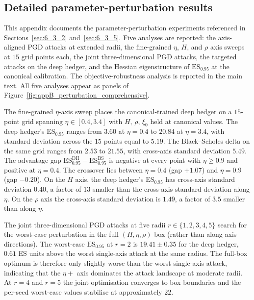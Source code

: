 \documentclass[12pt,a4paper]{article}
\theoremstyle{definition}
\theoremstyle{plain}
\theoremstyle{remark}
\theoremstyle{plain}
\begin{document}
\subsection{Detailed parameter-perturbation results}
\label{app:detailed_perturbation}

This appendix documents the parameter-perturbation experiments
referenced in Sections~\ref{sec:6_3_2} and~\ref{sec:6_3_5}. Five
analyses are reported: the axis-aligned PGD attacks at extended
radii, the fine-grained $\eta$, $H$, and $\rho$ axis sweeps at $15$
grid points each, the joint three-dimensional PGD attacks, the
targeted attacks on the deep hedger, and the Hessian eigenstructure
of $\mathrm{ES}_{0.95}$ at the canonical calibration. The
objective-robustness analysis is reported in the main text. All five
analyses appear as panels of
Figure~\ref{fig:appB_perturbation_comprehensive}.

The fine-grained $\eta$-axis sweep places the canonical-trained deep
hedger on a $15$-point grid spanning $\eta \in [0.4, 3.4]$ with $H$,
$\rho$, $\xi_0$ held at canonical values. The deep hedger's
$\mathrm{ES}_{0.95}$ ranges from $3.60$ at $\eta = 0.4$ to $20.84$ at
$\eta = 3.4$, with standard deviation across the $15$ points equal to
$5.19$. The Black--Scholes delta on the same grid ranges from $2.53$
to $21.55$, with cross-axis standard deviation $5.49$. The advantage
gap $\mathrm{ES}_{0.95}^{\mathrm{DH}} - \mathrm{ES}_{0.95}^{\mathrm{BS}}$
is negative at every point with $\eta \geq 0.9$ and positive at
$\eta = 0.4$. The crossover lies between $\eta = 0.4$ (gap $+1.07$)
and $\eta = 0.9$ (gap $-0.20$). On the $H$ axis, the deep hedger's
$\mathrm{ES}_{0.95}$ has cross-axis standard deviation $0.40$, a
factor of $13$ smaller than the cross-axis standard deviation along
$\eta$. On the $\rho$ axis the cross-axis standard deviation is
$1.49$, a factor of $3.5$ smaller than along $\eta$.

The joint three-dimensional PGD attacks at five radii $r \in \{1, 2,
3, 4, 5\}$ search for the worst-case perturbation in the full
$(H, \eta, \rho)$ box (rather than along axis directions). The
worst-case $\mathrm{ES}_{0.95}$ at $r = 2$ is $19.41 \pm 0.35$ for
the deep hedger, $0.61$ ES units above the worst single-axis
attack at the same radius. The full-box optimum is therefore only
slightly worse than the worst single-axis attack, indicating that
the $\eta+$ axis dominates the attack landscape at moderate radii.
At $r = 4$ and $r = 5$ the joint optimisation converges to box
boundaries and the per-seed worst-case values stabilise at
approximately $22$.
\end{document}
